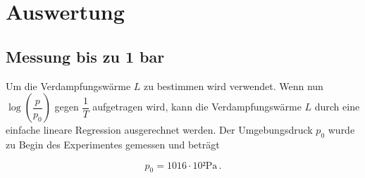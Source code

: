 \section{Auswertung}
\label{sec:auswertung}

\subsection{Messung bis zu 1 bar}
\label{subsec:Auswertung_a}
Um die Verdampfungswärme $L$ zu bestimmen wird 
verwendet. Wenn nun $\log{(\dfrac{\unit{p}}{\unit{p_0}})}$ gegen $\dfrac{1}{T}$ aufgetragen wird, kann die Verdampfungswärme $L$ durch eine einfache lineare Regression ausgerechnet werden. 
Der Umgebungsdruck $p_0$ wurde zu Begin des Experimentes gemessen und beträgt 

\begin{equation*}
    p_0 = 1016 \cdot 10² \unit{\pascal}    \,.
\end{equation*}

